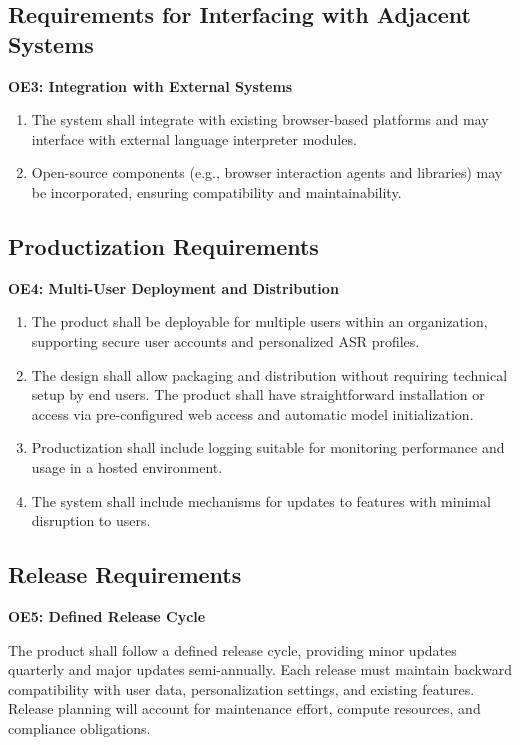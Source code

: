 \documentclass[11pt]{article}
\begin{document}
\subsection{Requirements for Interfacing with Adjacent Systems}\label{subsec:adjacent-systems}

\textbf{OE3: Integration with External Systems}\label{req:OE3}
\begin{enumerate}
    \item The system shall integrate with existing browser-based platforms and may interface with external language interpreter modules.
    \item Open-source components (e.g., browser interaction agents and libraries) may be incorporated, ensuring compatibility and maintainability.
\end{enumerate}

\subsection{Productization Requirements}\label{subsec:productization}

\textbf{OE4: Multi-User Deployment and Distribution}\label{req:OE4}
\begin{enumerate}
    \item The product shall be deployable for multiple users within an organization, supporting secure user accounts and personalized ASR profiles.
    \item The design shall allow packaging and distribution without requiring technical setup by end users. The product shall have straightforward installation or access via pre-configured web access and automatic model initialization.
    \item Productization shall include logging suitable for monitoring performance and usage in a hosted environment.
    \item The system shall include mechanisms for updates to features with minimal disruption to users.
\end{enumerate}
\subsection{Release Requirements}\label{subsec:release}

\textbf{OE5: Defined Release Cycle}\label{req:OE5}

The product shall follow a defined release cycle, providing minor updates quarterly and major updates semi-annually. Each release must maintain backward compatibility with user data, personalization settings, and existing features. Release planning will account for maintenance effort, compute resources, and compliance obligations.
\end{document}
